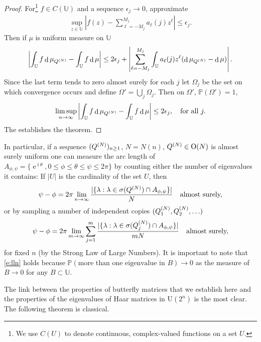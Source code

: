 \documentclass{amsart}
\theoremstyle{definition}
\theoremstyle{remark}
\numberwithin{equation}{section}
\DeclareMathOperator{\D}{d}
\DeclareMathOperator{\E}{e}
\DeclareMathOperator{\I}{i}
\begin{document}
\begin{proof}
For\footnote{We use $C(U)$ to denote continuous, complex-valued functions on a set $U$.} $f \in C(\mathbb U)$ and a sequence $\epsilon_j \to 0$, approximate
\begin{align}
\sup_{z \in \mathbb U} \left| f(z) - \sum_{\ell = -M_j}^{M_j} a_\ell(j) z^\ell \right| \leq \epsilon_j.
\end{align}
Then if $\mu$ is uniform measure on $\mathbb U$
\begin{align}
\left| \int_{\mathbb U} f \D\mu_{Q\pp{N}} - \int_{\mathbb U} f \D\mu \right| \leq 2 \epsilon_j + \left| \sum_{\ell = -M_j}^{M_j}  \int_{\mathbb U} a_\ell(j) z^\ell (\D\mu_{Q\pp{N}} - \D\mu) \right|.
\end{align}
Since the last term tends to zero almost surely for each $j$ let $\Omega_j$ be the set on which convergence occurs and define $\Omega ' = \bigcup_j \Omega_j$.  Then on  $\Omega'$, $\mathbb P(\Omega') = 1$,
\begin{align}
\limsup_{n \to \infty} \left| \int_{\mathbb U} f \D\mu_{Q\pp{N}} - \int_{\mathbb U} f \D\mu \right| \leq 2 \epsilon_j, \quad \text{for all } j.
\end{align}
The establishes the theorem.
\end{proof}

In particular, if a sequence $(Q^{(N)})_{n \geq 1}$, $N = N(n)$, $Q^{(N)} \in \mathrm O(N)$ is almost surely uniform one can measure the arc length of $A_{\phi,\psi} = \{ \E^{\I \theta}, 0 \leq \phi \leq \theta \leq \psi \leq 2 \pi\}$ by counting either the number of eigenvalues it contains:  If $|U|$ is the cardinality of the set $U$, then
\begin{align}\label{e:as}
\psi - \phi = 2 \pi \lim_{n \to \infty} \frac{| \{ \lambda : \lambda \in \sigma( Q^{(N)} ) \cap A_{\phi,\psi} \} |}{N}~~ \text{ almost surely,}
\end{align}
or by sampling a number of independent copies $(Q^{(N)}_1,Q^{(N)}_2, \ldots)$
\begin{align}\label{e:lln}
\psi - \phi = 2 \pi \lim_{m \to \infty}   \sum_{j=1}^m \frac{| \{ \lambda : \lambda \in \sigma( Q^{(N)}_j ) \cap A_{\phi,\psi} \} |}{mN}~~ \text{ almost surely,}
\end{align}
for fixed $n$ (by the Strong Law of Large Numbers).  It is important to note that \eqref{e:lln} holds because $\mathbb P( \text{more than one eigenvalue in } B) \to 0$ as the measure of $B \to 0$ for any $B \subset \mathbb U$.  


The link between the properties of butterfly matrices that we establish here and the properties of the eigenvalues of Haar matrices in $\mathrm{U}(2^n)$ is the most clear. The following theorem is classical.
\end{document}
